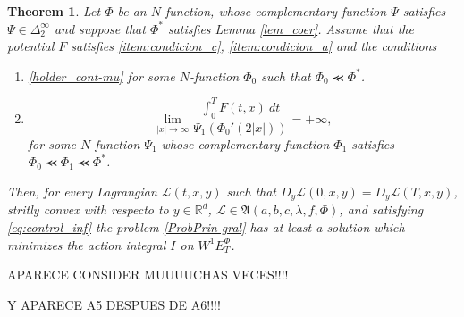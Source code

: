 \documentclass[twoside]{article}
\newtheorem{thm}{Theorem}[section]
\theoremstyle{remark}
\newcommand{\ephi}{E^{\Phi}}
\newcommand{\wphie}{W^{1}\ephi}
\newcommand{\rr}{\mathbb{R}}
\begin{document}
\begin{thm}\label{coercitividad-r} Let $\Phi$ be an $N$-function, whose complementary function $\Psi$ satisfies  $\Psi\in\Delta_2^{\infty}$ and suppose that $\Phi^*$ satisfies  Lemma \ref{lem_coer}. Assume that the potential $F$ satisfies \ref{item:condicion_c}, \ref{item:condicion_a} and the conditions

\begin{enumerate}
 \item  \eqref{holder_cont-mu}  for some
 $N$-function  $\Phi_0$ such that $\Phi_0\llcurly\Phi^*$.

 \item \begin{equation}\label{eq:propiedad-coercividad-phi0}
\lim_{|x|\to\infty}\frac{\int_{0}^{T}F(t,x)\ dt}{\Psi_1(\Phi_0'(2|x|))}=+\infty,\tag{$A_5$}
\end{equation}
for some $N$-function $\Psi_1$ whose complementary function $\Phi_1$ satisfies $\Phi_0\llcurly \Phi_1\llcurly \Phi^*$.
\end{enumerate}

Then,  for every Lagrangian $\mathcal{L}(t,x,y)$ such that  $D_y\mathcal{L}(0,x,y)=D_y\mathcal{L}(T,x,y)$,  stritly convex with respecto to $y\in\rr^d$,  $\mathcal{L}\in \mathfrak{A}(a,b,c,\lambda,f,\Phi)$, and satisfying \eqref{eq:control_inf} the problem \eqref{ProbPrin-gral} has at least a solution which minimizes the action integral $I$ on $\wphie_T$.

\end{thm}


APARECE CONSIDER MUUUUCHAS VECES!!!!

Y APARECE A5 DESPUES DE A6!!!!
\end{document}
